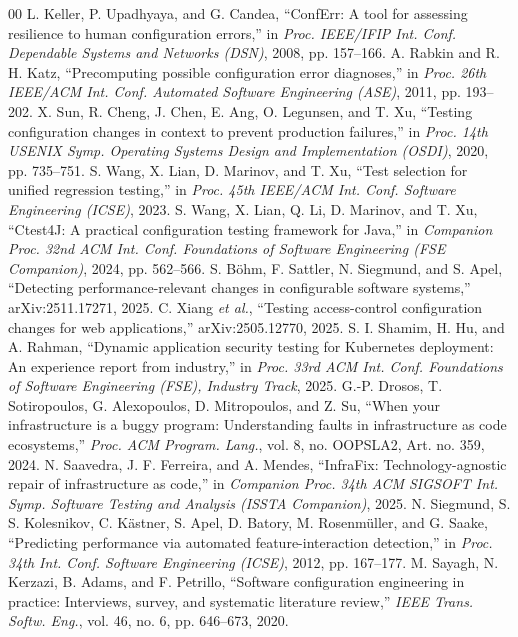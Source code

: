 \documentclass[conference]{IEEEtran}
\begin{document}
\begin{thebibliography}{00}
 L. Keller, P. Upadhyaya, and G. Candea, ``ConfErr: A tool for assessing resilience to human configuration errors,'' in \emph{Proc. IEEE/IFIP Int. Conf. Dependable Systems and Networks (DSN)}, 2008, pp. 157--166.
 A. Rabkin and R. H. Katz, ``Precomputing possible configuration error diagnoses,'' in \emph{Proc. 26th IEEE/ACM Int. Conf. Automated Software Engineering (ASE)}, 2011, pp. 193--202.
 X. Sun, R. Cheng, J. Chen, E. Ang, O. Legunsen, and T. Xu, ``Testing configuration changes in context to prevent production failures,'' in \emph{Proc. 14th USENIX Symp. Operating Systems Design and Implementation (OSDI)}, 2020, pp. 735--751.
 S. Wang, X. Lian, D. Marinov, and T. Xu, ``Test selection for unified regression testing,'' in \emph{Proc. 45th IEEE/ACM Int. Conf. Software Engineering (ICSE)}, 2023.
 S. Wang, X. Lian, Q. Li, D. Marinov, and T. Xu, ``Ctest4J: A practical configuration testing framework for Java,'' in \emph{Companion Proc. 32nd ACM Int. Conf. Foundations of Software Engineering (FSE Companion)}, 2024, pp. 562--566.
 S. B\"{o}hm, F. Sattler, N. Siegmund, and S. Apel, ``Detecting performance-relevant changes in configurable software systems,'' arXiv:2511.17271, 2025.
 C. Xiang \emph{et al.}, ``Testing access-control configuration changes for web applications,'' arXiv:2505.12770, 2025.
 S. I. Shamim, H. Hu, and A. Rahman, ``Dynamic application security testing for Kubernetes deployment: An experience report from industry,'' in \emph{Proc. 33rd ACM Int. Conf. Foundations of Software Engineering (FSE), Industry Track}, 2025.
 G.-P. Drosos, T. Sotiropoulos, G. Alexopoulos, D. Mitropoulos, and Z. Su, ``When your infrastructure is a buggy program: Understanding faults in infrastructure as code ecosystems,'' \emph{Proc. ACM Program. Lang.}, vol. 8, no. OOPSLA2, Art. no. 359, 2024.
 N. Saavedra, J. F. Ferreira, and A. Mendes, ``InfraFix: Technology-agnostic repair of infrastructure as code,'' in \emph{Companion Proc. 34th ACM SIGSOFT Int. Symp. Software Testing and Analysis (ISSTA Companion)}, 2025.
 N. Siegmund, S. S. Kolesnikov, C. K\"{a}stner, S. Apel, D. Batory, M. Rosenm\"{u}ller, and G. Saake, ``Predicting performance via automated feature-interaction detection,'' in \emph{Proc. 34th Int. Conf. Software Engineering (ICSE)}, 2012, pp. 167--177.
 M. Sayagh, N. Kerzazi, B. Adams, and F. Petrillo, ``Software configuration engineering in practice: Interviews, survey, and systematic literature review,'' \emph{IEEE Trans. Softw. Eng.}, vol. 46, no. 6, pp. 646--673, 2020.

\end{thebibliography}
\end{document}
